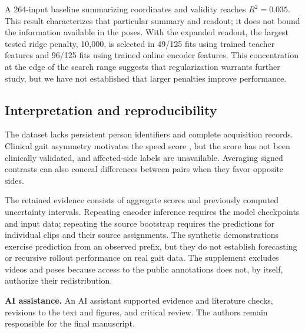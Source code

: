 \documentclass{article}
\begin{document}
A 264-input baseline summarizing coordinates and validity reaches
\(R^2=0.035\). This result characterizes that particular summary and
readout; it does not bound the information available in the poses. With
the expanded readout, the largest tested ridge penalty, 10,000, is
selected in 49/125 fits using trained teacher features and 96/125 fits
using trained online encoder features. This concentration at the edge of
the search range suggests that regularization warrants further study,
but we have not established that larger penalties improve performance.

\subsection{Interpretation and
reproducibility}\label{interpretation-and-reproducibility}

The dataset lacks persistent person identifiers and complete acquisition
records. Clinical gait asymmetry motivates the speed score
\citep{stroke}, but the score has not been clinically validated, and
affected-side labels are unavailable. Averaging signed contrasts can
also conceal differences between pairs when they favor opposite sides.

The retained evidence consists of aggregate scores and previously
computed uncertainty intervals. Repeating encoder inference requires the
model checkpoints and input data; repeating the source bootstrap
requires the predictions for individual clips and their source
assignments. The synthetic demonstrations exercise prediction from an
observed prefix, but they do not establish forecasting or recursive
rollout performance on real gait data. The supplement excludes videos
and poses because access to the public annotations does not, by itself,
authorize their redistribution.

\textbf{AI assistance.} An AI assistant supported evidence and
literature checks, revisions to the text and figures, and critical
review. The authors remain responsible for the final manuscript.
\end{document}

